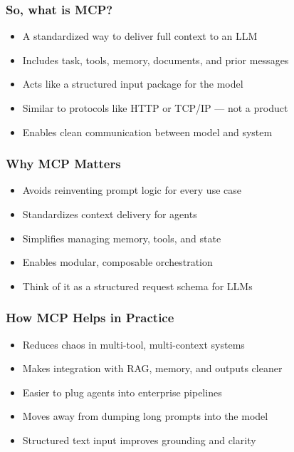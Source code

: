 \begin{frame}[fragile]\frametitle{So, what is MCP?}
      \begin{itemize}
        \item A standardized way to deliver full context to an LLM
        \item Includes task, tools, memory, documents, and prior messages
        \item Acts like a structured input package for the model
        \item Similar to protocols like HTTP or TCP/IP — not a product
        \item Enables clean communication between model and system
      \end{itemize}
\end{frame}

\begin{frame}[fragile]\frametitle{Why MCP Matters}
      \begin{itemize}
        \item Avoids reinventing prompt logic for every use case
        \item Standardizes context delivery for agents
        \item Simplifies managing memory, tools, and state
        \item Enables modular, composable orchestration
        \item Think of it as a structured request schema for LLMs
      \end{itemize}
\end{frame}

\begin{frame}[fragile]\frametitle{How MCP Helps in Practice}
      \begin{itemize}
        \item Reduces chaos in multi-tool, multi-context systems
        \item Makes integration with RAG, memory, and outputs cleaner
        \item Easier to plug agents into enterprise pipelines
        \item Moves away from dumping long prompts into the model
        \item Structured text input improves grounding and clarity
      \end{itemize}
\end{frame}

